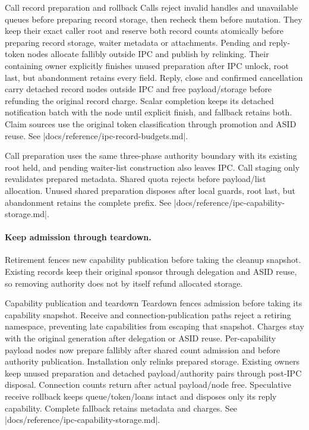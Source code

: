 \begin{implementationdetail}{Call record preparation and rollback}
Calls reject invalid handles and unavailable queues before preparing record
storage, then recheck them before mutation. They keep their exact caller root
and reserve both record counts atomically
before preparing record storage, waiter metadata or attachments. Pending and
reply-token nodes allocate fallibly outside IPC and publish by relinking. Their containing
owner explicitly finishes unused preparation after IPC unlock, root last, but
abandonment retains every field. Reply, close and confirmed cancellation carry detached record nodes outside IPC
and free payload/storage before refunding the original record charge. Scalar
completion keeps its detached notification batch with the node until explicit
finish, and fallback retains both. Claim sources use the original token
classification through promotion and ASID reuse. See \repofile|docs/reference/ipc-record-budgets.md|.

Call preparation uses the same three-phase authority boundary with its existing
root held, and pending waiter-list construction also leaves IPC. Call staging
only revalidates prepared metadata. Shared quota rejects before payload/list
allocation. Unused shared preparation disposes after local guards, root last, but
abandonment retains the complete prefix. See
\repofile|docs/reference/ipc-capability-storage.md|.
\end{implementationdetail}

\paragraph*{Keep admission through teardown.}

Retirement fences new capability publication before taking the cleanup snapshot.
Existing records keep their original sponsor through delegation and ASID reuse, so
removing authority does not by itself refund allocated storage.

\begin{implementationdetail}{Capability publication and teardown}
Teardown fences admission before taking its capability snapshot. Receive and
connection-publication paths reject a retiring namespace, preventing late
capabilities from escaping that snapshot. Charges stay with the original
generation after delegation or ASID reuse. Per-capability payload nodes now
prepare fallibly after shared count admission and before authority publication.
Installation only relinks prepared storage. Existing owners keep unused
preparation and detached payload/authority pairs through post-IPC disposal.
Connection counts return after actual payload/node free. Speculative receive
rollback keeps queue/token/loans intact and disposes only its reply capability.
Complete fallback retains metadata and charges. See
\repofile|docs/reference/ipc-capability-storage.md|.
\end{implementationdetail}


